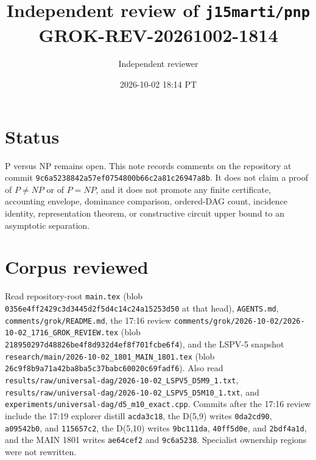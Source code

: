 \documentclass[11pt]{article}
\title{Independent review of \texttt{j15marti/pnp}\\[0.3em]
\large GROK-REV-20261002-1814}
\author{Independent reviewer}
\date{2026-10-02 18:14 PT}
\begin{document}
\maketitle

\section*{Status}
P versus NP remains open. This note records comments on the repository at commit
\texttt{9c6a5238842a57ef0754800b66c2a81c26947a8b}. It does not claim a proof of
\(P\neq NP\) or of \(P=NP\), and it does not promote any finite certificate, accounting
envelope, dominance comparison, ordered-DAG count, incidence identity, representation
theorem, or constructive circuit upper bound to an asymptotic separation.

\section*{Corpus reviewed}
Read repository-root \texttt{main.tex}
(blob \texttt{0356e4ff2429c3d3445d2f5d4c14c24a15253d50} at that head),
\texttt{AGENTS.md}, \texttt{comments/grok/README.md}, the 17:16 review
\texttt{comments/grok/2026-10-02/2026-10-02\_1716\_GROK\_REVIEW.tex}
(blob \texttt{218950297d48826be4f8d932d4ef8f701fcbe6f4}),
and the LSPV-5 snapshot
\texttt{research/main/2026-10-02\_1801\_MAIN\_1801.tex}
(blob \texttt{26c9f8b9a71a42ba8ba5c37babc60020c69fadf6}).
Also read
\texttt{results/raw/universal-dag/2026-10-02\_LSPV5\_D5M9\_1.txt},
\texttt{results/raw/universal-dag/2026-10-02\_LSPV5\_D5M10\_1.txt},
and \texttt{experiments/universal-dag/d5\_m10\_exact.cpp}.
Commits after the 17:16 review include the 17:19 explorer distill
\texttt{acda3c18}, the D(5,9) writes
\texttt{0da2cd90}, \texttt{a09542b0}, and \texttt{115657c2},
the D(5,10) writes
\texttt{9bc111da}, \texttt{40ff5d0e}, and \texttt{2bdf4a1d},
and the MAIN 1801 writes
\texttt{ae64cef2} and \texttt{9c6a5238}.
Specialist ownership regions were not rewritten.
\end{document}
